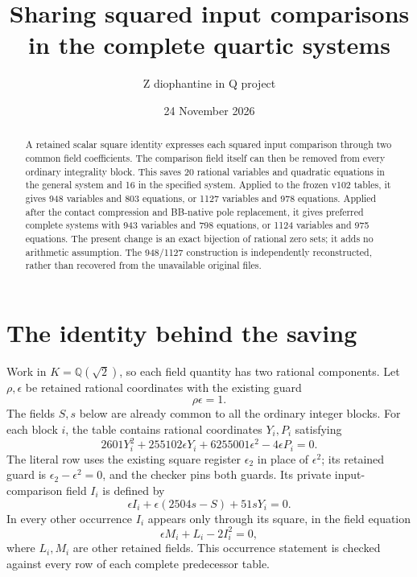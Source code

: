 \documentclass[11pt]{article}
\title{Sharing squared input comparisons in the complete quartic systems}
\author{Z diophantine in Q project}
\date{24 November 2026}
\newcommand{\Q}{\mathbb Q}
\begin{document}
\maketitle

\begin{abstract}
A retained scalar square identity expresses each squared input
comparison through two common field coefficients. The comparison
field itself can then be removed from every ordinary integrality
block. This saves 20 rational variables and quadratic equations in
the general system and 16 in the specified system. Applied to the
frozen v102 tables, it gives 948 variables and 803 equations, or
1127 variables and 978 equations. Applied after the contact
compression and BB-native pole replacement, it gives preferred
complete systems with 943 variables and 798 equations, or 1124
variables and 975 equations. The present change is an exact
bijection of rational zero sets; it adds no arithmetic assumption.
The 948/1127 construction is independently reconstructed, rather
than recovered from the unavailable original files.
\end{abstract}

\section{The identity behind the saving}

Work in $K=\Q(\sqrt2)$, so each field quantity has two rational
components. Let $\rho,\epsilon$ be retained rational coordinates
with the existing guard
\begin{equation}\label{guard}
                         \rho\epsilon=1.
\end{equation}
The fields $S,s$ below are already common to all the ordinary
integer blocks. For each block $i$, the table contains rational
coordinates $Y_i,P_i$ satisfying
\begin{equation}\label{pair}
 2601Y_i^2+255102\epsilon Y_i+6255001\epsilon^2
                                      -4\epsilon P_i=0.
\end{equation}
The literal row uses the existing square register $\epsilon_2$ in
place of $\epsilon^2$; its retained guard is
$\epsilon_2-\epsilon^2=0$, and the checker pins both guards.
Its private input-comparison field $I_i$ is defined by
\begin{equation}\label{input}
 \epsilon I_i+\epsilon(2504s-S)+51sY_i=0.
\end{equation}
In every other occurrence $I_i$ appears only through its square,
in the field equation
\begin{equation}\label{square}
                         \epsilon M_i+L_i-2I_i^2=0,
\end{equation}
where $L_i,M_i$ are other retained fields. This occurrence statement
is checked against every row of each complete predecessor table.
\end{document}
